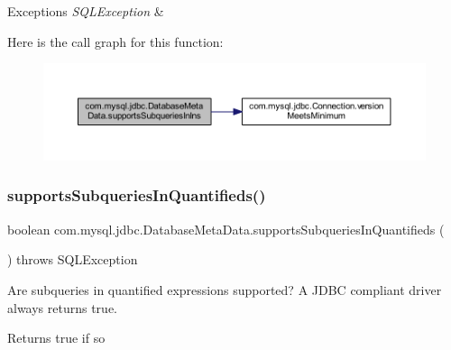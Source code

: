 \begin{DoxyExceptions}{Exceptions}
{\em S\+Q\+L\+Exception} & \\
\hline
\end{DoxyExceptions}
Here is the call graph for this function\+:
\nopagebreak
\begin{figure}[H]
\begin{center}
\leavevmode
\includegraphics[width=350pt]{classcom_1_1mysql_1_1jdbc_1_1_database_meta_data_a66302a5e773430272b72475fadeb5060_cgraph}
\end{center}
\end{figure}
\mbox{\label{classcom_1_1mysql_1_1jdbc_1_1_database_meta_data_abd4be564ca2700088f26f0507032fc0e}} 
\subsubsection{\texorpdfstring{supports\+Subqueries\+In\+Quantifieds()}{supportsSubqueriesInQuantifieds()}}
{\footnotesize\ttfamily boolean com.\+mysql.\+jdbc.\+Database\+Meta\+Data.\+supports\+Subqueries\+In\+Quantifieds (\begin{DoxyParamCaption}{ }\end{DoxyParamCaption}) throws S\+Q\+L\+Exception}

Are subqueries in quantified expressions supported? A J\+D\+BC compliant driver always returns true.

\begin{DoxyReturn}{Returns}
true if so 
\end{DoxyReturn}

